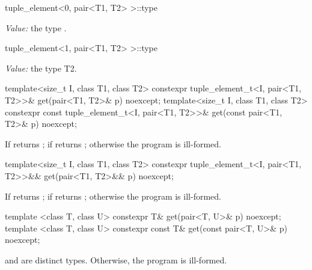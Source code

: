 %
\begin{itemdecl}
tuple_element<0, pair<T1, T2> >::type
\end{itemdecl}
\begin{itemdescr}
\pnum\textit{Value:} the type .
\end{itemdescr}

%
\begin{itemdecl}
tuple_element<1, pair<T1, T2> >::type
\end{itemdecl}
\begin{itemdescr}
\pnum\textit{Value:} the type T2.
\end{itemdescr}

%
%
\begin{itemdecl}
template<size_t I, class T1, class T2>
  constexpr tuple_element_t<I, pair<T1, T2>>&
    get(pair<T1, T2>& p) noexcept;
template<size_t I, class T1, class T2>
  constexpr const tuple_element_t<I, pair<T1, T2>>&
    get(const pair<T1, T2>& p) noexcept;
\end{itemdecl}
\begin{itemdescr}

\pnum\returns If  returns ;
if  returns ; otherwise the program is ill-formed.
\end{itemdescr}

%
%
\begin{itemdecl}
template<size_t I, class T1, class T2>
  constexpr tuple_element_t<I, pair<T1, T2>>&&
    get(pair<T1, T2>&& p) noexcept;
\end{itemdecl}
\begin{itemdescr}

\pnum
\returns If  returns ;
if  returns
;
otherwise the program is ill-formed.
\end{itemdescr}

%
%
\begin{itemdecl}
template <class T, class U>
  constexpr T& get(pair<T, U>& p) noexcept;
template <class T, class U>
  constexpr const T& get(const pair<T, U>& p) noexcept;
\end{itemdecl}
\begin{itemdescr}

\pnum
\requires {} and  are distinct types. Otherwise, the program is ill-formed.

\pnum
\returns {}
\end{itemdescr}

